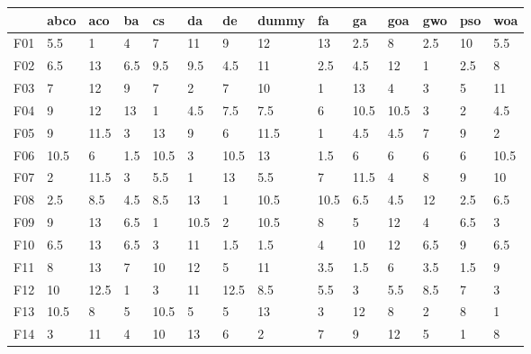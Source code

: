 \begin{table}
    \centering
    \begin{adjustbox}{width=\linewidth}
        \begin{tabular}{llllllllllllll}
            \toprule
            {}   & abco  & aco    & ba    & cs    & da    & de    & dummy & fa    & ga    & goa   & gwo   & pso   & woa   \\
            \midrule
            F01  & 5.5   & 1      & 4     & 7     & 11    & 9     & 12    & 13    & 2.5   & 8     & 2.5   & 10    & 5.5   \\
            F02  & 6.5   & 13     & 6.5   & 9.5   & 9.5   & 4.5   & 11    & 2.5   & 4.5   & 12    & 1     & 2.5   & 8     \\
            F03  & 7     & 12     & 9     & 7     & 2     & 7     & 10    & 1     & 13    & 4     & 3     & 5     & 11    \\
            F04  & 9     & 12     & 13    & 1     & 4.5   & 7.5   & 7.5   & 6     & 10.5  & 10.5  & 3     & 2     & 4.5   \\
            F05  & 9     & 11.5   & 3     & 13    & 9     & 6     & 11.5  & 1     & 4.5   & 4.5   & 7     & 9     & 2     \\
            F06  & 10.5  & 6      & 1.5   & 10.5  & 3     & 10.5  & 13    & 1.5   & 6     & 6     & 6     & 6     & 10.5  \\
            F07  & 2     & 11.5   & 3     & 5.5   & 1     & 13    & 5.5   & 7     & 11.5  & 4     & 8     & 9     & 10    \\
            F08  & 2.5   & 8.5    & 4.5   & 8.5   & 13    & 1     & 10.5  & 10.5  & 6.5   & 4.5   & 12    & 2.5   & 6.5   \\
            F09  & 9     & 13     & 6.5   & 1     & 10.5  & 2     & 10.5  & 8     & 5     & 12    & 4     & 6.5   & 3     \\
            F10  & 6.5   & 13     & 6.5   & 3     & 11    & 1.5   & 1.5   & 4     & 10    & 12    & 6.5   & 9     & 6.5   \\
            F11  & 8     & 13     & 7     & 10    & 12    & 5     & 11    & 3.5   & 1.5   & 6     & 3.5   & 1.5   & 9     \\
            F12  & 10    & 12.5   & 1     & 3     & 11    & 12.5  & 8.5   & 5.5   & 3     & 5.5   & 8.5   & 7     & 3     \\
            F13  & 10.5  & 8      & 5     & 10.5  & 5     & 5     & 13    & 3     & 12    & 8     & 2     & 8     & 1     \\
            F14  & 3     & 11     & 4     & 10    & 13    & 6     & 2     & 7     & 9     & 12    & 5     & 1     & 8     \\

\end{tabular}
\end{adjustbox}
\end{table}
